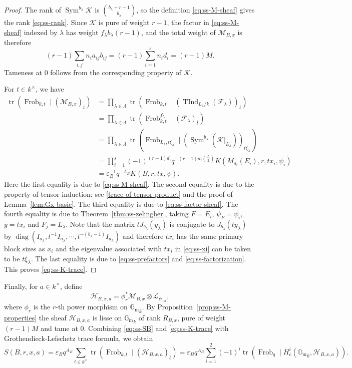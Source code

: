 \documentclass[11pt]{amsart}
\theoremstyle{remark}
\newcommand{\Gm}{\mathbb G_{\mathrm m}}
\newcommand{\Frob}{\operatorname{Frob}}
\newcommand{\TInd}{\operatorname{TInd}}
\newcommand{\Sym}{\operatorname{Sym}}
\newcommand{\cF}{\mathcal F}
\newcommand{\cK}{\mathcal K}
\newcommand{\cL}{\mathcal L}
\newcommand{\cH}{\mathcal H}
\begin{document}
\begin{proof}
The rank of $\Sym^{b_{\lambda}}\cK$ is
$\binom{b_{\lambda}+r-1}{b_{\lambda}}$, so the
definition \eqref{eq:ss-M-sheaf} gives the rank
\eqref{eq:ss-rank}. Since $\cK$ is pure of weight $r-1$, the factor in \eqref{eq:ss-M-sheaf} indexed
by $\lambda$ has weight $f_{\lambda} b_{\lambda}(r-1)$, and the total weight of $\mathcal{M}_{B,x}$ is
therefore
\[
 (r-1)\sum_{i,j}n_i a_{ij}b_{ij}=(r-1)\sum_{i=1}^s n_i d_i = (r-1)M.
\]
Tameness at $0$ follows from the corresponding property of $\cK$.

For $t\in k^{\times}$, we have
\begin{align*}
\operatorname{tr}(\Frob_{k,t}\mid(\mathcal{M}_{B,x})_{\bar{t}}) &= \prod_{\lambda\in\Lambda}
\operatorname{tr}(\Frob_{k,t}\mid(\TInd_{L_{\lambda}/k}(\cF_{\lambda}))_{\bar{t}})\\
&=\prod_{\lambda\in\Lambda}
\operatorname{tr}(\Frob_{k,t}^{f_{\lambda}}\mid(\cF_{\lambda})_{\bar{t}})\\
&=\prod_{\lambda\in\Lambda}\operatorname{tr}(\Frob_{L_{\lambda},t\xi_{\lambda}}\mid(\Sym^{b_{\lambda}}(\cK|_{L_{\lambda}}))_{\bar{t\xi_{\lambda}}})\\
&=\prod_{i=1}^s (-1)^{(r-1)d_i}q^{-(r-1)n_i \binom{d_i}{2}} K(M_{d_i}(E_i),r,tx_i,\psi_i)\\
&= \varepsilon_{B}^{-1} q^{-A_B}K(B,r,tx,\psi).
\end{align*}
Here the first equality is due to \eqref{eq:ss-M-sheaf}. The second equality is due to the property of tensor induction; see \eqref{trace of tensor product} and the proof of Lemma~\ref{lem:Gx-basic}. The third equality is due to \eqref{eq:ss-factor-sheaf}. The fourth equality is due to Theorem~\ref{thm:ss-zelingher}, taking $F=E_i$, $\psi_F=\psi_i$, $y=tx_i$ and $F_j=L_{\lambda}$. Note that the matrix $tJ_{b_{\lambda}}(y_{\lambda})$ is conjugate to $J_{b_{\lambda}}(ty_{\lambda})$ by $\operatorname{diag}(I_{a_{\lambda}},t^{-1}I_{a_{\lambda}},\cdots,t^{-(b_{\lambda}-1)}I_{a_{\lambda}})$ and therefore $t x_i$ has the
same primary block sizes as $x_i$ and the eigenvalue associated with $t x_i$ in \eqref{eq:ss-xi} can be taken to be $t \xi_{\lambda}$.
The last equality is due to \eqref{eq:ss-prefactors} and \eqref{eq:ss-factorization}. This proves \eqref{eq:ss-K-trace}.
\end{proof}

Finally, for $a\in k^{\times}$, define
\begin{equation}\label{eq:ss-H-sheaf}
\cH_{B,x,a}=\phi_r^*\mathcal{M}_{B,x}\otimes\cL_{\psi_{-a}},
\end{equation}
where $\phi_r$ is the $r$-th power morphism on ${\Gm}_k$. By Proposition~\ref{prop:ss-M-properties} the sheaf $\cH_{B,x,a}$ is lisse on ${\Gm}_k$ of rank $R_{B,x}$, pure of weight $(r-1)M$ and tame at $0$. Combining \eqref{eq:ss-SB} and \eqref{eq:ss-K-trace} with Grothendieck-Lefschetz trace formula, we obtain
\begin{equation}\label{eq:ss-sum-as-traces}
S(B,r,x,a)=\varepsilon_Bq^{A_B}\sum_{t\in k^{\times}}\operatorname{tr}\left(\Frob_{k,t}\mid(\cH_{B,x,a})_{\bar{t}}\right)=\varepsilon_Bq^{A_B}\sum_{i=1}^2 (-1)^i \operatorname{tr}\left(\Frob_q\mid H_c^i({\Gm}_{\bar{k}},\cH_{B,x,a})\right).
\end{equation}
\end{document}
